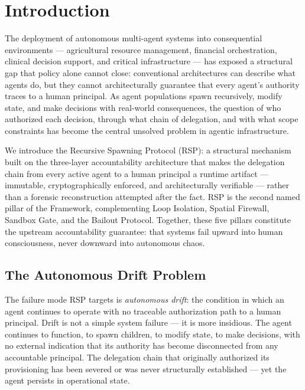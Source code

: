 \section{Introduction}

The deployment of autonomous multi-agent systems into consequential environments — agricultural resource management, financial orchestration, clinical decision support, and critical infrastructure — has exposed a structural gap that policy alone cannot close: conventional architectures can describe what agents do, but they cannot architecturally guarantee that every agent's authority traces to a human principal. As agent populations spawn recursively, modify state, and make decisions with real-world consequences, the question of who authorized each decision, through what chain of delegation, and with what scope constraints has become the central unsolved problem in agentic infrastructure.

We introduce the Recursive Spawning Protocol (RSP): a structural mechanism built on the \bxthree three-layer accountability architecture that makes the delegation chain from every active agent to a human principal a runtime artifact — immutable, cryptographically enforced, and architecturally verifiable — rather than a forensic reconstruction attempted after the fact. RSP is the second named pillar of the \bxthree Framework, complementing Loop Isolation, Spatial Firewall, Sandbox Gate, and the Bailout Protocol. Together, these five pillars constitute the upstream accountability guarantee: that \bxthree systems fail upward into human consciousness, never downward into autonomous chaos.

\subsection{The Autonomous Drift Problem}

The failure mode RSP targets is \emph{autonomous drift}: the condition in which an agent continues to operate with no traceable authorization path to a human principal. Drift is not a simple system failure — it is more insidious. The agent continues to function, to spawn children, to modify state, to make decisions, with no external indication that its authority has become disconnected from any accountable principal. The delegation chain that originally authorized its provisioning has been severed or was never structurally established — yet the agent persists in operational state.

